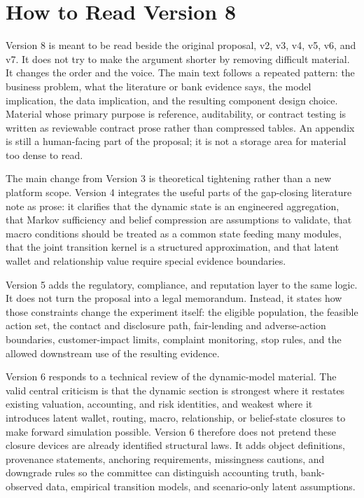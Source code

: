 \documentclass[11pt]{article}
\newcommand{\1}{\mathbf{1}}
\begin{document}
\section*{How to Read Version 8}

Version 8 is meant to be read beside the original proposal, v2, v3, v4, v5,
v6, and v7. It does not
try to make the argument shorter by removing difficult material. It changes the
order and the voice. The main text follows a repeated pattern: the business
problem, what the literature or bank evidence says, the model implication, the
data implication, and the resulting component design choice. Material whose
primary purpose is reference, auditability, or contract testing is written as
reviewable contract prose rather than compressed tables. An appendix is still a
human-facing part of the proposal; it is not a storage area for material too
dense to read.

The main change from Version 3 is theoretical tightening rather than a new
platform scope. Version 4 integrates the useful parts of the gap-closing
literature note as prose: it clarifies that the dynamic state is an engineered
aggregation, that Markov sufficiency and belief compression are assumptions to
validate, that macro conditions should be treated as a common state feeding many
modules, that the joint transition kernel is a structured approximation, and
that latent wallet and relationship value require special evidence boundaries.

Version 5 adds the regulatory, compliance, and reputation layer to the same
logic. It does not turn the proposal into a legal memorandum. Instead, it
states how those constraints change the experiment itself: the eligible
population, the feasible action set, the contact and disclosure path,
fair-lending and adverse-action boundaries, customer-impact limits, complaint
monitoring, stop rules, and the allowed downstream use of the resulting
evidence.

Version 6 responds to a technical review of the dynamic-model material. The
valid central criticism is that the dynamic section is strongest where it
restates existing valuation, accounting, and risk identities, and weakest where
it introduces latent wallet, routing, macro, relationship, or belief-state
closures to make forward simulation possible. Version 6 therefore does not
pretend these closure devices are already identified structural laws. It adds
object definitions, provenance statements, anchoring requirements, missingness
cautions, and downgrade rules so the committee can distinguish accounting
truth, bank-observed data, empirical transition models, and scenario-only
latent assumptions.
\end{document}
